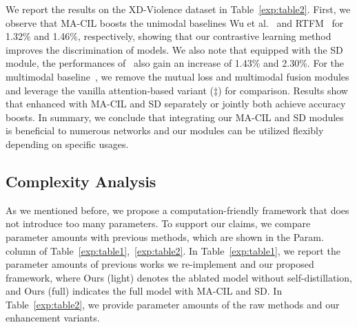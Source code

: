 \documentclass[sigconf]{acmart}
\begin{document}
\begin{table}[t]
\caption{Ablation studies on different components of our proposed framework.}
\end{table}

We report the results on the XD-Violence dataset in Table~\ref{exp:table2}. First, we observe that MA-CIL boosts the unimodal baselines Wu et al.~\cite{wu2020not} and RTFM~\cite{tian2021weakly} for 1.32\% and 1.46\%, respectively, showing that our contrastive learning method improves the discrimination of models. We also note that equipped with the SD module, the performances of~\cite{wu2020not, tian2021weakly} also gain an increase of 1.43\% and 2.30\%. For the multimodal baseline~\cite{pang2021violence}, we remove the mutual loss and multimodal fusion modules and leverage the vanilla attention-based variant ($\ddagger$) for comparison. Results show that enhanced with MA-CIL and SD separately or jointly both achieve accuracy boosts. In summary, we conclude that integrating our MA-CIL and SD modules is beneficial to numerous networks and our modules can be utilized flexibly depending on specific usages. 

\subsection{Complexity Analysis}

As we mentioned before, we propose a computation-friendly framework that does not introduce too many parameters. To support our claims, we compare parameter amounts with previous methods, which are shown in the Param. column of Table~\ref{exp:table1},~\ref{exp:table2}. In Table~\ref{exp:table1}, we report the parameter amounts of previous works we re-implement and our proposed framework, where Ours (light) denotes the ablated model without self-distillation, and Ours (full) indicates the full model with MA-CIL and SD. In Table~\ref{exp:table2}, we provide parameter amounts of the raw methods and our enhancement variants.
\end{document}
